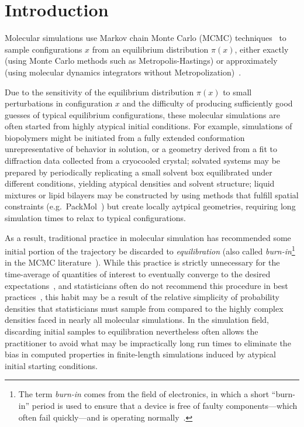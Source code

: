 \documentclass[aps,pre,twocolumn,nofootinbib,superscriptaddress,linenumbers,11point]{revtex4-1}
\begin{document}
\section*{Introduction}
\label{section:introduction}

Molecular simulations use Markov chain Monte Carlo (MCMC) techniques~\cite{jun-s-liu:mcmc} to sample configurations $x$ from an equilibrium distribution $\pi(x)$, either exactly (using Monte Carlo methods such as Metropolis-Hastings) or approximately (using molecular dynamics integrators without Metropolization)~\cite{sivak:2013:prx:vvvr}.

Due to the sensitivity of the equilibrium distribution $\pi(x)$ to small perturbations in configuration $x$ and the difficulty of producing sufficiently good guesses of typical equilibrium configurations, these molecular simulations are often started from highly atypical initial conditions.
For example, simulations of biopolymers might be initiated from a fully extended conformation unrepresentative of behavior in solution, or a geometry derived from a fit to diffraction data collected from a cryocooled crystal; 
solvated systems may be prepared by periodically replicating a small solvent box equilibrated under different conditions, yielding atypical densities and solvent structure; 
liquid mixtures or lipid bilayers may be constructed by using methods that fulfill spatial constraints (e.g.~PackMol~\cite{martinez:jctc:2009:packmol}) but create locally aytpical geometries, requiring long simulation times to relax to typical configurations.

As a result, traditional practice in molecular simulation has recommended some initial portion of the trajectory be discarded to \emph{equilibration} (also called \emph{burn-in}\footnote{The term \emph{burn-in} comes from the field of electronics, in which a short ``burn-in'' period is used to ensure that a device is free of faulty components---which often fail quickly---and is operating normally~\cite{crc-mcmc-handbook}.} in the MCMC literature~\cite{crc-mcmc-handbook}).
While this practice is strictly unnecessary for the time-average of quantities of interest to eventually converge to the desired expectations~\cite{geyer:burn-in-unnecessary}, and statisticians often do not recommend this procedure in best practices~\cite{crc-mcmc-handbook}, this habit may be a result of the relative simplicity of probability densities that statisticians must sample from compared to the highly complex densities faced in nearly all molecular simulations.
In the simulation field, discarding initial samples to equilibration nevertheless often allows the practitioner to avoid what may be impractically long run times to eliminate the bias in computed properties in finite-length simulations induced by atypical initial starting conditions.
\end{document}

